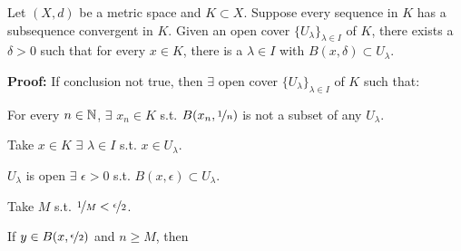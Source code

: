\documentclass[10pt,aspectratio=149]{beamer}
\begin{document}
\begin{frame}



\begin{lemma}
Let $(X,d)$ be a metric space and $K \subset X$.
\pause
Suppose 
every sequence in $K$ has a subsequence convergent in $K$.
\pause
Given
an open cover $\{ U_\lambda \}_{\lambda \in I}$ of $K$, there exists a
$\delta > 0$ such that for every $x \in K$, there is a $\lambda \in I$
with $B(x,\delta) \subset U_\lambda$.
\end{lemma}

\pause
\textbf{Proof:}
If conclusion not true, then $\exists$
open cover $\{ U_\lambda \}_{\lambda \in I}$ of $K$ such that:

\pause
\medskip

For every $n \in {\mathbb{N}}$, $\exists$ $x_n \in K$ s.t.
$B(x_n,\nicefrac{1}{n})$ is not a subset of any $U_\lambda$.

\pause
\medskip

Take $x \in K$ \wthus $\exists$
$\lambda \in I$ s.t. $x \in U_\lambda$.

\pause
$U_\lambda$ is open \wthus
$\exists$ $\epsilon > 0$ s.t.  $B(x,\epsilon) \subset U_\lambda$.

\pause
\medskip

Take $M$ s.t.  $\nicefrac{1}{M} < \nicefrac{\epsilon}{2}$.

\pause
\medskip

If $y \in B(x,\nicefrac{\epsilon}{2})$ and $n \geq M$, then 


\end{frame}
\end{document}
